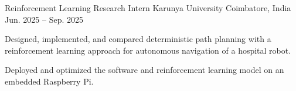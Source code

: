 \begin{cventries}
  \cventry
    {Reinforcement Learning Research Intern}
    {Karunya University}
    {Coimbatore, India}
    {Jun. 2025 -- Sep. 2025}
    {
      \begin{cvitems}
        \item {Designed, implemented, and compared deterministic path planning with a reinforcement learning approach for autonomous navigation of a hospital robot.}
        \item {Deployed and optimized the software and reinforcement learning model on an embedded Raspberry Pi.}
      \end{cvitems}
    }
\end{cventries}
